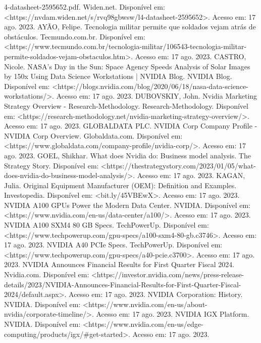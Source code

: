 \documentclass[conference]{IEEEtran}
\begin{document}
\begin{thebibliography}{00}

 ‌4-datasheet-2595652.pdf. Widen.net. Disponível em: <https://nvdam.widen.net/s/rvq98gbwsw/l4-datasheet-2595652>. Acesso em: 17 ago. 2023.
 AYÃO, Felipe. Tecnologia militar permite que soldados vejam atrás de obstáculos. Tecmundo.com.br. Disponível em: <https://www.tecmundo.com.br/tecnologia-militar/106543-tecnologia-militar-permite-soldados-vejam-obstaculos.htm>. Acesso em: 17 ago. 2023.
 CASTRO, Nicole. NASA’s Day in the Sun: Space Agency Speeds Analysis of Solar Images by 150x Using Data Science Workstations | NVIDIA Blog. NVIDIA Blog. Disponível em: <https://blogs.nvidia.com/blog/2020/06/18/nasa-data-science-workstations/>. Acesso em: 17 ago. 2023.
 DUBOVSKIY, John. Nvidia Marketing Strategy Overview - Research-Methodology. Research-Methodology. Disponível em: <https://research-methodology.net/nvidia-marketing-strategy-overview/>. Acesso em: 17 ago. 2023.
 GLOBALDATA PLC. NVIDIA Corp Company Profile - NVIDIA Corp Overview. Globaldata.com. Disponível em: <https://www.globaldata.com/company-profile/nvidia-corp/>. Acesso em: 17 ago. 2023.
 GOEL, Shikhar. What does Nvidia do: Business model analysis. The Strategy Story. Disponível em: <https://thestrategystory.com/2023/01/05/what-does-nvidia-do-business-model-analysis/>. Acesso em: 17 ago. 2023.
 KAGAN, Julia. Original Equipment Manufacturer (OEM): Definition and Examples. Investopedia. Disponível em: <bit.ly/45VBEwX>. Acesso em: 17 ago. 2023.
 NVIDIA A100 GPUs Power the Modern Data Center. NVIDIA. Disponível em: <https://www.nvidia.com/en-us/data-center/a100/>. Acesso em: 17 ago. 2023.
 NVIDIA A100 SXM4 80 GB Specs. TechPowerUp. Disponível em: <https://www.techpowerup.com/gpu-specs/a100-sxm4-80-gb.c3746>. Acesso em: 17 ago. 2023.
 NVIDIA A40 PCIe Specs. TechPowerUp. Disponível em: <https://www.techpowerup.com/gpu-specs/a40-pcie.c3700>. Acesso em: 17 ago. 2023.
 NVIDIA Announces Financial Results for First Quarter Fiscal 2024. Nvidia.com. Disponível em: <https://investor.nvidia.com/news/press-release-details/2023/NVIDIA-Announces-Financial-Results-for-First-Quarter-Fiscal-2024/default.aspx>. Acesso em: 17 ago. 2023.
 NVIDIA Corporation: History. NVIDIA. Disponível em: <https://www.nvidia.com/en-us/about-nvidia/corporate-timeline/>. Acesso em: 17 ago. 2023.
 NVIDIA IGX Platform. NVIDIA. Disponível em: <https://www.nvidia.com/en-us/edge-computing/products/igx/#get-started>. Acesso em: 17 ago. 2023.

\end{thebibliography}
\end{document}
